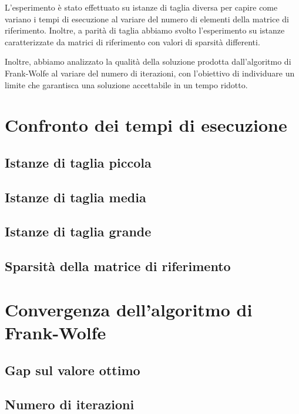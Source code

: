 L'esperimento è stato effettuato su istanze di taglia diversa per capire come variano i tempi di esecuzione al variare
del numero di elementi della matrice di riferimento. Inoltre, a parità di taglia abbiamo svolto l'esperimento su istanze
caratterizzate da matrici di riferimento con valori di sparsità differenti.



Inoltre, abbiamo analizzato la qualità della
soluzione prodotta dall'algoritmo di Frank-Wolfe al variare del numero di iterazioni, con l'obiettivo di individuare un
limite che garantisca una soluzione accettabile in un tempo ridotto.
\newpage

\section{Confronto dei tempi di esecuzione}

\subsection{Istanze di taglia piccola}

\subsection{Istanze di taglia media}

\subsection{Istanze di taglia grande}

\subsection{Sparsità della matrice di riferimento}

\section{Convergenza dell'algoritmo di Frank-Wolfe}

\subsection{Gap sul valore ottimo}

\subsection{Numero di iterazioni}


